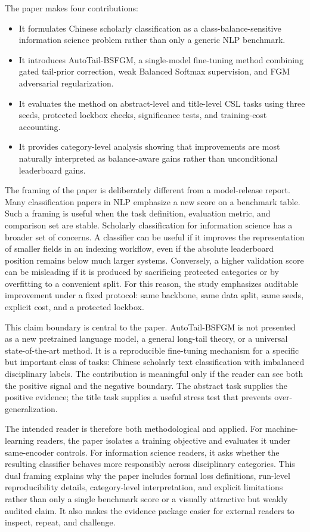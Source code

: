 \documentclass[10pt]{article}
\begin{document}
The paper makes four contributions:
\begin{itemize}
  \item It formulates Chinese scholarly classification as a class-balance-sensitive information science problem rather than only a generic NLP benchmark.
  \item It introduces AutoTail-BSFGM, a single-model fine-tuning method combining gated tail-prior correction, weak Balanced Softmax supervision, and FGM adversarial regularization.
  \item It evaluates the method on abstract-level and title-level CSL tasks using three seeds, protected lockbox checks, significance tests, and training-cost accounting.
  \item It provides category-level analysis showing that improvements are most naturally interpreted as balance-aware gains rather than unconditional leaderboard gains.
\end{itemize}

The framing of the paper is deliberately different from a model-release report. Many classification papers in NLP emphasize a new score on a benchmark table. Such a framing is useful when the task definition, evaluation metric, and comparison set are stable. Scholarly classification for information science has a broader set of concerns. A classifier can be useful if it improves the representation of smaller fields in an indexing workflow, even if the absolute leaderboard position remains below much larger systems. Conversely, a higher validation score can be misleading if it is produced by sacrificing protected categories or by overfitting to a convenient split. For this reason, the study emphasizes auditable improvement under a fixed protocol: same backbone, same data split, same seeds, explicit cost, and a protected lockbox.

This claim boundary is central to the paper. AutoTail-BSFGM is not presented as a new pretrained language model, a general long-tail theory, or a universal state-of-the-art method. It is a reproducible fine-tuning mechanism for a specific but important class of tasks: Chinese scholarly text classification with imbalanced disciplinary labels. The contribution is meaningful only if the reader can see both the positive signal and the negative boundary. The abstract task supplies the positive evidence; the title task supplies a useful stress test that prevents over-generalization.

The intended reader is therefore both methodological and applied. For machine-learning readers, the paper isolates a training objective and evaluates it under same-encoder controls. For information science readers, it asks whether the resulting classifier behaves more responsibly across disciplinary categories. This dual framing explains why the paper includes formal loss definitions, run-level reproducibility details, category-level interpretation, and explicit limitations rather than only a single benchmark score or a visually attractive but weakly audited claim. It also makes the evidence package easier for external readers to inspect, repeat, and challenge.
\end{document}
